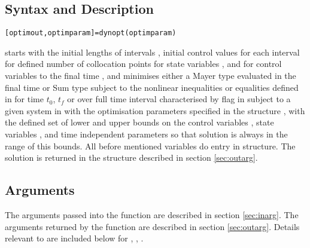 \subsection{Syntax and Description}
\label{sec:fundessyndes}
 
\begin{verbatim} 
[optimout,optimparam]=dynopt(optimparam)
\end{verbatim} 
starts with the initial lengths of intervals , initial
control values for each interval  for defined number of
collocation points for state variables , and for control
variables  to the final time , and minimises
either a Mayer type  evaluated in the final time or Sum type
 subject to the nonlinear inequalities or equalities
defined in  for time $t_0$, $t_f$ or over full time
interval characterised by flag in  subject to a given
system in  with the optimisation parameters specified
in the structure , with the defined set of lower and
upper bounds on the control variables , state variables
, and time independent parameters  so that
solution is always in the range of this bounds. All before mentioned
variables do entry  in  structure. The
solution is returned in the  structure described in
section \ref{sec:outarg}.   

\subsection{Arguments}
\label{sec:fundesarg}

The arguments passed into the function are described in section
\ref{sec:inarg}. The arguments returned by the function are described
in section \ref{sec:outarg}. Details relevant to  are
included below for , , . 


